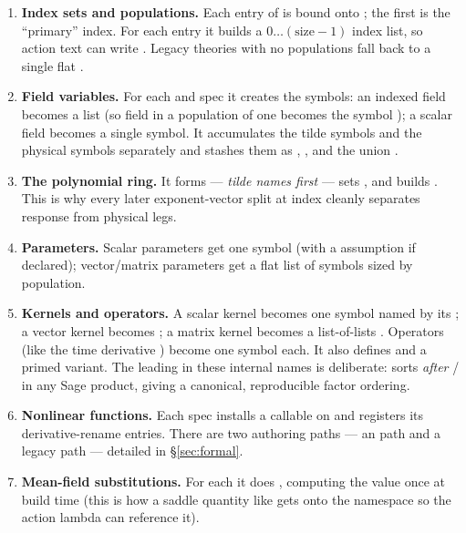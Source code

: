 \begin{enumerate}
  \item \textbf{Index sets and populations.} Each entry of 
        is bound onto ; the first is the ``primary'' index. For each
         entry it builds a $0\!\dots\!(\text{size}-1)$
        index list, so action text can write . Legacy theories
        with no populations fall back to a single flat .
  \item \textbf{Field variables.} For each  and
         spec it creates the  symbols: an indexed
        field becomes a list \code{[SR.var(f"\{fname\}\{i+1\}", latex\_name=...)]}
        (so field  in a population of one becomes the symbol ); a
        scalar field becomes a single symbol. It accumulates the tilde symbols and
        the physical symbols separately and stashes them as
        , , and the union
        .
  \item \textbf{The polynomial ring.} It forms
         --- \emph{tilde names
        first} --- sets , and builds
        . This is why every later
        exponent-vector split at index  cleanly separates response
        from physical legs.
  \item \textbf{Parameters.} Scalar parameters get one symbol (with a 
        assumption if declared); vector/matrix parameters get a flat list of symbols
        sized by population.
  \item \textbf{Kernels and operators.} A scalar kernel becomes one symbol named by
        its ; a vector kernel becomes ; a
        matrix kernel becomes a list-of-lists .
        Operators (like the time derivative ) become one symbol each. It
        also defines  and a primed
        variant. The leading  in these internal names is deliberate: 
        sorts \emph{after} / in any Sage product, giving a
        canonical, reproducible factor ordering.
  \item \textbf{Nonlinear functions.} Each  spec installs
        a callable on  and registers its derivative-rename entries. There
        are two authoring paths --- an  path and a legacy
         path --- detailed in \S\ref{sec:formal}.
  \item \textbf{Mean-field substitutions.} For each 
        it does , computing the
        value once at build time (this is how a saddle quantity like 
        gets onto the namespace so the action lambda can reference it).
\end{enumerate}

